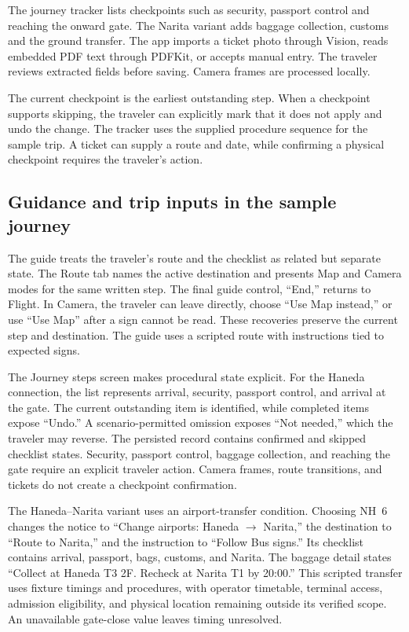 \documentclass[sigconf,nonacm,balance=false]{acmart}
\begin{document}
The journey tracker lists checkpoints such as security, passport control and reaching the onward gate. The Narita variant adds baggage collection, customs and the ground transfer. The app imports a ticket photo through Vision, reads embedded PDF text through PDFKit, or accepts manual entry. The traveler reviews extracted fields before saving. Camera frames are processed locally.

The current checkpoint is the earliest outstanding step. When a checkpoint supports skipping, the traveler can explicitly mark that it does not apply and undo the change. The tracker uses the supplied procedure sequence for the sample trip. A ticket can supply a route and date, while confirming a physical checkpoint requires the traveler's action.

\subsection{Guidance and trip inputs in the sample journey}
The guide treats the traveler's route and the checklist as related but separate state. The Route tab names the active destination and presents Map and Camera modes for the same written step. The final guide control, ``End,'' returns to Flight. In Camera, the traveler can leave directly, choose ``Use Map instead,'' or use ``Use Map'' after a sign cannot be read. These recoveries preserve the current step and destination. The guide uses a scripted route with instructions tied to expected signs.

The Journey steps screen makes procedural state explicit. For the Haneda connection, the list represents arrival, security, passport control, and arrival at the gate. The current outstanding item is identified, while completed items expose ``Undo.'' A scenario-permitted omission exposes ``Not needed,'' which the traveler may reverse. The persisted record contains confirmed and skipped checklist states. Security, passport control, baggage collection, and reaching the gate require an explicit traveler action. Camera frames, route transitions, and tickets do not create a checkpoint confirmation.

The Haneda--Narita variant uses an airport-transfer condition. Choosing NH~6 changes the notice to ``Change airports: Haneda $\rightarrow$ Narita,'' the destination to ``Route to Narita,'' and the instruction to ``Follow Bus signs.'' Its checklist contains arrival, passport, bags, customs, and Narita. The baggage detail states ``Collect at Haneda T3 2F. Recheck at Narita T1 by 20:00.'' This scripted transfer uses fixture timings and procedures, with operator timetable, terminal access, admission eligibility, and physical location remaining outside its verified scope. An unavailable gate-close value leaves timing unresolved.
\end{document}
